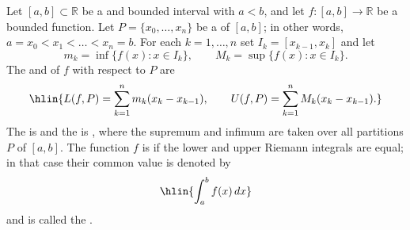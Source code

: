 \begin{definition} \label{definition:lower_upper_riemann_sum_integral_of_a_bounded_function_on_a_closed_interval_to_R_and_riemann_integrable_function}
    Let $[a,b] \subset \mathbb{R}$ be a  and bounded interval with $a < b$, and let $f : [a,b] \to \mathbb{R}$ be a bounded function.
    Let $P = \{x_0,\dots,x_n\}$ be a  of $[a,b]$; in other words, $a = x_0 < x_1 < \dots < x_n = b$. For each $k = 1,\dots,n$ set $I_k = [x_{k-1},x_k]$ and let
    $$m_k = \inf\{f(x) : x \in I_k\}, \qquad M_k = \sup\{f(x) : x \in I_k\}.$$
    The  and  of $f$ with respect to $P$ are
    $$\hlin{L(f,P) = \sum_{k=1}^n m_k (x_k - x_{k-1}), \qquad U(f,P) = \sum_{k=1}^n M_k (x_k - x_{k-1}).}$$
    The  is  and the  is , where the supremum and infimum are taken over all partitions $P$ of $[a,b]$.
    The function $f$ is  if the lower and upper Riemann integrals are equal; in that case their common value is denoted by
    $$\hlin{\int_a^b f(x)\,dx}$$
    and is called the .
\end{definition}
